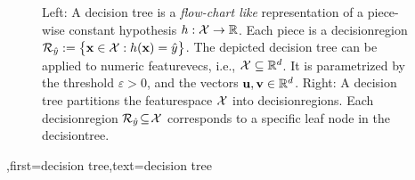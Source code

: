 {{\begin{figure}[htbp]
\begin{minipage}{.45\textwidth}
\end{minipage}
	\caption{Left: A decision tree is a \emph{flow-chart like} representation of a piece-wise constant \gls{hypothesis} $h: \mathcal{X} \rightarrow \mathbb{R}$.  Each piece is a \gls{decisionregion} $\mathcal{R}_{\hat{y}} := \big\{ {\bf x} \in  \mathcal{X}: h({\bf x}) = \hat{y} \big\}$. 
		The depicted decision tree can be applied to numeric \gls{featurevec}s, i.e., $\mathcal{X} \subseteq \mathbb{R}^{d}$. It is  parametrized by the threshold $\varepsilon>0$, and the vectors ${\bf u}, {\bf v} \in \mathbb{R}^{d}$. 
		Right: A decision tree partitions  
		the \gls{featurespace} $\mathcal{X}$ into \gls{decisionregion}s. Each \gls{decisionregion}  
		$\mathcal{R}_{\hat{y}} \!\subseteq\!\mathcal{X}$ corresponds to a specific leaf node in the \gls{decisiontree}.}
	\label{fig_decision_tree}
\end{figure} 
	  }
	  ,first={decision tree},text={decision tree} }



